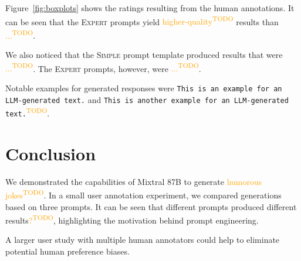 \documentclass[11pt]{article}
\newcommand{\todo}[1]{\textcolor{orange}{#1\textsuperscript{\footnotesize TODO}}}
\begin{document}
Figure~\ref{fig:boxplots} shows the ratings resulting from the human annotations.
It can be seen that the \textsc{Expert} prompts yield \todo{higher-quality} results than \todo{...}.

We also noticed that the \textsc{Simple} prompt template produced results that were \todo{...}. The \textsc{Expert} prompts, however, were \todo{...}.

Notable examples for generated responses were \texttt{This is an example for an LLM-generated text.} and  \texttt{This is another example for an LLM-generated text.}\todo{}.

\section{Conclusion}

We demonstrated the capabilities of Mixtral 8\texttimes 7B to generate \todo{humorous jokes}. In a small user annotation experiment, we compared generations based on three prompts.
It can be seen that different prompts produced different results\todo{?}, highlighting the motivation behind prompt engineering.

A larger user study with multiple human annotators could help to eliminate potential human preference biases.


\end{document}
